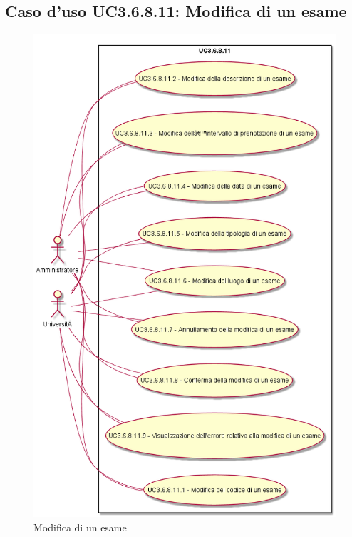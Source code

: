 \subsection{Caso d'uso \texorpdfstring{UC3.6.8.11}{UC3.6.8.11}: Modifica di un esame}
\begin{figure} [H]
\centering
\includegraphics[scale=0.45]{./img/UC3-6-8-11.png}
\caption{Modifica di un esame}\label{}
\end{figure}
